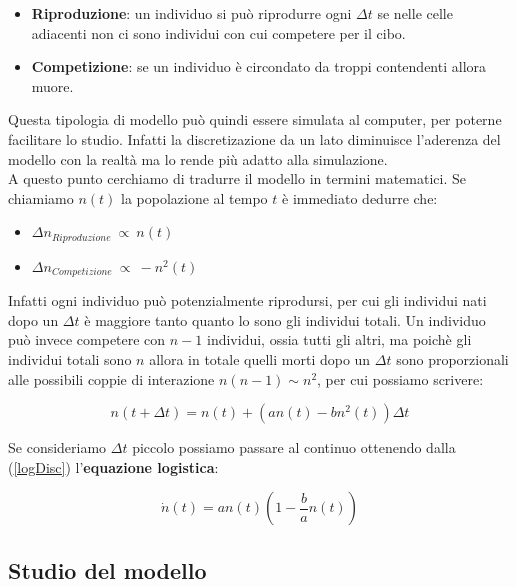 \begin{itemize}
	\item \textbf{Riproduzione}: un individuo si può riprodurre ogni $\Delta t$ se nelle celle adiacenti non ci sono individui con cui competere per il cibo.
	\item \textbf{Competizione}: se un individuo è circondato da troppi contendenti allora muore.
\end{itemize}

Questa tipologia di modello può quindi essere simulata al computer, per poterne facilitare lo studio. Infatti la discretizazione da un lato diminuisce l'aderenza del modello con la realtà ma lo rende più adatto alla simulazione.\\

A questo punto cerchiamo di tradurre il modello in termini matematici. Se chiamiamo $n(t)$ la popolazione al tempo $t$ è immediato dedurre che:

\begin{itemize}
	\item $\Delta n_{Riproduzione} \ \propto \ n(t)$
	\item $\Delta n_{Competizione} \ \propto \ -n^2(t)$
\end{itemize}

Infatti ogni individuo può potenzialmente riprodursi, per cui gli individui nati dopo un $\Delta t$ è maggiore tanto quanto lo sono gli individui totali. Un individuo può invece competere con $n-1$ individui, ossia tutti gli altri, ma poichè gli individui totali sono $n$ allora in totale quelli morti dopo un $\Delta t$ sono proporzionali alle possibili coppie di interazione $n(n-1)\sim n^2$, per cui possiamo scrivere:

\begin{equation}
	n(t+\Delta t)=n(t)+(an(t)-bn^2(t))\Delta t
	\label{logDisc}
\end{equation}

Se consideriamo $\Delta t$ piccolo possiamo passare al continuo ottenendo dalla (\ref{logDisc}) l'\textbf{equazione logistica}:

\begin{equation}
\dot{n}(t)=an(t)(1-\frac{b}{a}n(t)) \label{logequation}
\end{equation}

\subsection{Studio del modello}

